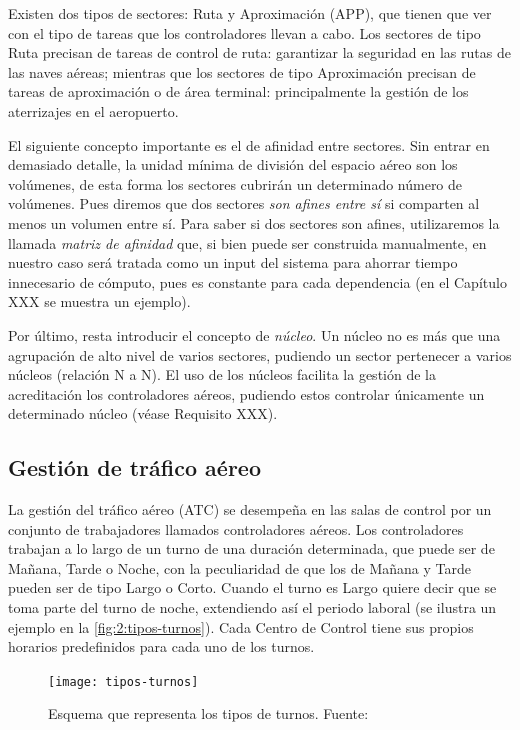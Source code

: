 Existen dos tipos de sectores: Ruta y Aproximación (APP), que tienen que ver con el tipo de tareas que los 
controladores llevan a cabo.
Los sectores de tipo Ruta precisan de tareas de control de ruta: garantizar la seguridad en las rutas de las naves aéreas; mientras que los sectores de tipo Aproximación precisan de tareas de aproximación o de área terminal: principalmente la gestión de los aterrizajes en el aeropuerto.

El siguiente concepto importante es el de afinidad entre sectores. Sin entrar en demasiado detalle, la unidad mínima de división del espacio aéreo son los volúmenes, de esta forma los sectores cubrirán un determinado número de volúmenes.
Pues diremos que dos sectores \textit{son afines entre sí} si comparten al menos un volumen entre sí. Para saber si dos sectores son afines, utilizaremos la llamada \textit{matriz de afinidad} que, si bien puede ser construida manualmente, en nuestro caso será tratada como un input del sistema para ahorrar tiempo innecesario de cómputo, pues es constante para cada dependencia (en el Capítulo XXX se muestra un ejemplo). %

Por último, resta introducir el concepto de \textit{núcleo}. Un núcleo no es más que una agrupación de alto nivel de varios sectores, pudiendo un sector pertenecer a varios núcleos (relación N a N). El uso de los núcleos facilita la gestión de la acreditación los controladores aéreos, pudiendo estos controlar únicamente un determinado núcleo (véase Requisito XXX). %


\subsection{Gestión de tráfico aéreo}
La gestión del tráfico aéreo (\gls{ATC}) se desempeña en las salas de control por un conjunto de trabajadores 
llamados controladores aéreos. Los controladores trabajan a lo largo de un turno de una duración determinada, que puede ser de Mañana, Tarde o Noche, con la peculiaridad de que los de Mañana y Tarde pueden ser de tipo Largo o Corto. 
Cuando el turno es Largo quiere decir que se toma parte del turno de noche, extendiendo así el periodo laboral (se ilustra un ejemplo en la \autoref{fig:2:tipos-turnos}). Cada \acrlong{Centro de Control} tiene sus propios horarios predefinidos para cada uno de los turnos.

\begin{figure}
	\centering
	\texttt{[image: tipos-turnos]}
	\caption[Esquema que representa los tipos de turnos]{Esquema que representa los tipos de turnos. 
	Fuente:~\cite{articulo1}}
	\label{fig:2:tipos-turnos}
\end{figure}

